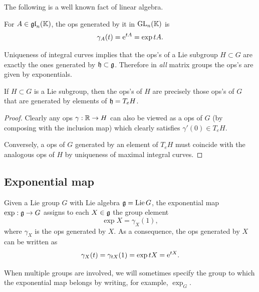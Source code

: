 The following is a well known fact of linear algebra.

\begin{prop}
    For $A\in \mathfrak{gl}_n(\mathbb{K})$, the \gls{ops} generated by it in $\operatorname{GL}_n(\mathbb{K})$ is
    \[\gamma_A(t)=\mathrm{e}^{tA}=\exp tA.\]
\end{prop}
\begin{cor}
    Uniqueness of integral curves implies that the \gls{ops}'s of a Lie subgroup $H\subset G$ are exactly the ones generated by $\mathfrak{h} \subset \mathfrak{g}$. Therefore in \emph{all} matrix groups the \gls{ops}'s are given by exponentials.
\end{cor}

\begin{prop}\label{prop 20.3 Lee}
    If $H\subset G$ is a Lie subgroup, then the \gls{ops}'s of $H$ are precisely those \gls{ops}'s of $G$ that are generated by elements of $\mathfrak{h}=T_e H$.
\end{prop}
\begin{proof}
    Clearly any \gls{ops} $\gamma:\mathbb{R}\to H$ can also be viewed as a \gls{ops} of $G$ (by composing with the inclusion map) which clearly satisfies $\gamma'(0)\in T_e H$.

    Conversely, a \gls{ops} of $G$ generated by an element of $T_e H$ must coincide with the analogous \gls{ops} of $H$ by uniqueness of maximal integral curves.
\end{proof}







\subsection{Exponential map}


\begin{defn}
    Given a Lie group $G$ with Lie algebra $\mathfrak{g}=\operatorname{Lie} G$, the exponential map $\exp:\mathfrak{g}\to G$ assigns to each $X\in \mathfrak{g}$ the group element
    \[\exp X=\gamma_X(1),\]
    where $\gamma_X$ is the \gls{ops} generated by $X$. As a consequence, the \gls{ops} generated by $X$ can be written as \[\gamma_X(t)=\gamma_{tX}(1)=\exp tX=\mathrm{e}^{tX}.\]
\end{defn}

When multiple groups are involved, we will sometimes specify the group to which the exponential map belongs by writing, for example, $\exp_G$.

